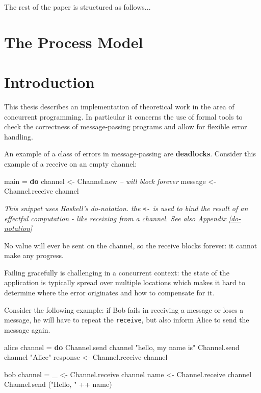 \documentclass[runningheads,plain]{llncs}
\newenvironment{Shaded}{}{}
\newcommand{\KeywordTok}[1]{\textcolor[rgb]{0.00,0.44,0.13}{\textbf{#1}}}
\newcommand{\StringTok}[1]{\textcolor[rgb]{0.25,0.44,0.63}{#1}}
\newcommand{\CommentTok}[1]{\textcolor[rgb]{0.38,0.63,0.69}{\textit{#1}}}
\newcommand{\OtherTok}[1]{\textcolor[rgb]{0.00,0.44,0.13}{#1}}
\newcommand{\FunctionTok}[1]{\textcolor[rgb]{0.02,0.16,0.49}{#1}}
\newcommand{\NormalTok}[1]{#1}
\begin{document}
The rest of the paper is structured as follows...

\section{The Process Model}
\section{Introduction}\label{introduction}

This thesis describes an implementation of theoretical work in the area
of concurrent programming. In particular it concerns the use of formal
tools to check the correctness of message-passing programs and allow for
flexible error handling.

An example of a class of errors in message-passing are
\textbf{deadlocks}. Consider this example of a receive on an empty
channel:

\begin{Shaded}
\begin{Highlighting}[]
\NormalTok{main }\FunctionTok{=} \KeywordTok{do}
\NormalTok{    channel }\OtherTok{<-}\NormalTok{ Channel.new}
    \CommentTok{-- will block forever}
\NormalTok{    message }\OtherTok{<-}\NormalTok{ Channel.receive channel}
\end{Highlighting}
\end{Shaded}

\emph{This snippet uses Haskell's do-notation. the \texttt{\textless{}-}
is used to bind the result of an effectful computation - like receiving
from a channel. See also Appendix \ref{do-notation}}

No value will ever be sent on the channel, so the receive blocks
forever: it cannot make any progress.

Failing gracefully is challenging in a concurrent context: the state of
the application is typically spread over multiple locations which makes
it hard to determine where the error originates and how to compensate
for it.

Consider the following example: if Bob fails in receiving a message or
loses a message, he will have to repeat the \texttt{receive}, but also
inform Alice to send the message again.

\begin{Shaded}
\begin{Highlighting}[]
\NormalTok{alice channel }\FunctionTok{=} \KeywordTok{do} 
\NormalTok{    Channel.send channel }\StringTok{"hello, my name is"}
\NormalTok{    Channel.send channel }\StringTok{"Alice"}
\NormalTok{    response }\OtherTok{<-}\NormalTok{ Channel.receive channel}
    
\NormalTok{bob channel }\FunctionTok{=} 
\NormalTok{    _ }\OtherTok{<-}\NormalTok{ Channel.receive channel }
\NormalTok{    name }\OtherTok{<-}\NormalTok{ Channel.receive channel}
\NormalTok{    Channel.send (}\StringTok{"Hello, "} \FunctionTok{++}\NormalTok{ name) }
\end{Highlighting}
\end{Shaded}
\end{document}
